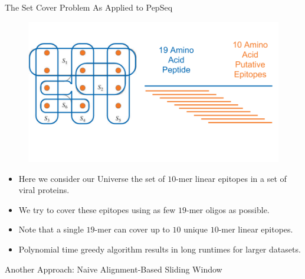 \documentclass[final]{beamer}
\newlength{\colwidth}
\begin{document}
\begin{frame}[t]
\begin{columns}[t]
\begin{column}{\colwidth}
\begin{block}{The Set Cover Problem As Applied to PepSeq}
    \begin{figure}
      \includegraphics[width=0.7\colwidth]{figures/set_cover_oligo.png}
      \label{fig:library}
    \end{figure}
    \begin{itemize}
      \item Here we consider our Universe the set of $10$-mer linear epitopes in a set of viral proteins.
      \item We try to cover these epitopes using as few $19$-mer oligos as possible.
      \item Note that a single $19$-mer can cover up to $10$ unique $10$-mer linear epitopes.
      \item Polynomial time greedy algorithm results in long runtimes for larger datasets.
    \end{itemize}


\end{block}

\begin{block}{Another Approach: Naive Alignment-Based Sliding Window}


\end{block}
\end{column}
\end{columns}
\end{frame}
\end{document}
